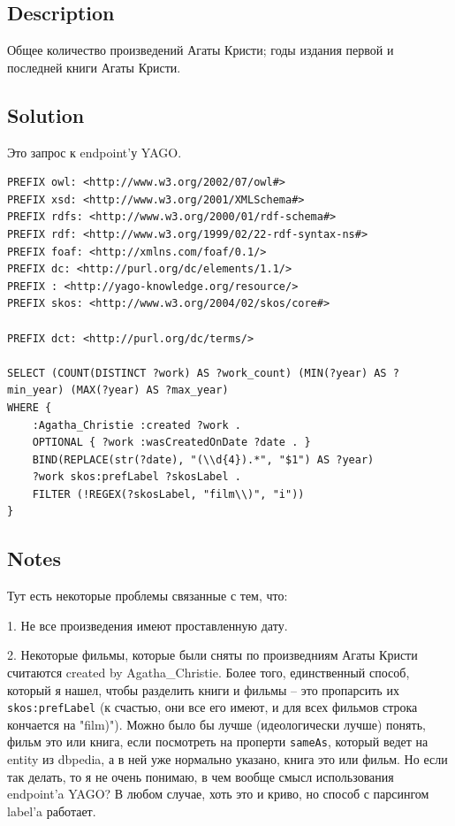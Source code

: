 \documentclass{article}
\begin{document}
\subsection*{Description}
Общее количество произведений Агаты Кристи; годы издания первой и последней книги Агаты Кристи.
\subsection*{Solution}

Это запрос к endpoint'у YAGO.

\begin{verbatim}
PREFIX owl: <http://www.w3.org/2002/07/owl#>
PREFIX xsd: <http://www.w3.org/2001/XMLSchema#>
PREFIX rdfs: <http://www.w3.org/2000/01/rdf-schema#>
PREFIX rdf: <http://www.w3.org/1999/02/22-rdf-syntax-ns#>
PREFIX foaf: <http://xmlns.com/foaf/0.1/>
PREFIX dc: <http://purl.org/dc/elements/1.1/>
PREFIX : <http://yago-knowledge.org/resource/>
PREFIX skos: <http://www.w3.org/2004/02/skos/core#>

PREFIX dct: <http://purl.org/dc/terms/>

SELECT (COUNT(DISTINCT ?work) AS ?work_count) (MIN(?year) AS ?min_year) (MAX(?year) AS ?max_year)
WHERE {
    :Agatha_Christie :created ?work .
    OPTIONAL { ?work :wasCreatedOnDate ?date . }
    BIND(REPLACE(str(?date), "(\\d{4}).*", "$1") AS ?year)
    ?work skos:prefLabel ?skosLabel .
    FILTER (!REGEX(?skosLabel, "film\\)", "i"))
}
\end{verbatim}
\subsection*{Notes}

Тут есть некоторые проблемы связанные с тем, что:

1. Не все произведения имеют проставленную дату. 

2. Некоторые фильмы, которые были сняты по произведниям Агаты Кристи считаются created by Agatha\_Christie. Более того,
единственный способ, который я нашел, чтобы разделить книги и фильмы -- это пропарсить их \texttt{skos:prefLabel} (к счастью,
они все его имеют, и для всех фильмов строка кончается на "film)"). Можно было бы лучше (идеологически лучше) понять, фильм это или книга, если посмотреть на проперти \texttt{sameAs}, который ведет на entity из dbpedia, а в ней уже нормально
указано, книга это или фильм. Но если так делать, то я не очень понимаю, в чем вообще смысл использования endpoint'a YAGO? В любом случае, хоть это и криво, но способ с парсингом label'a работает.
\end{document}

